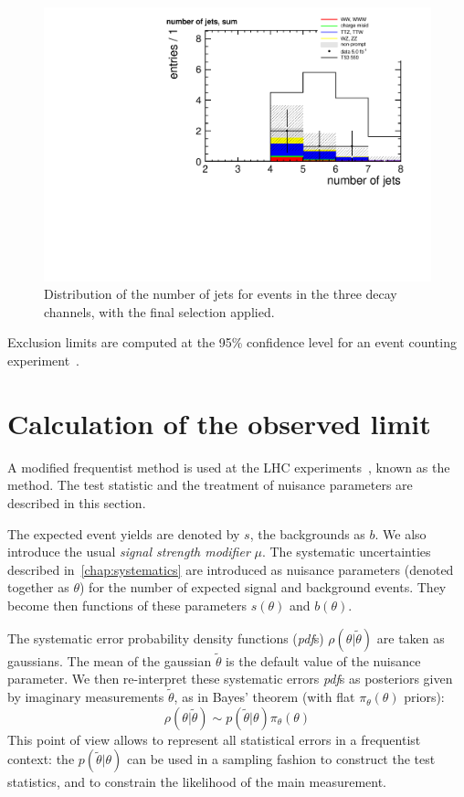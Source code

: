 \begin{figure}[htb]
    \centering
    \includegraphics[width=\textwidth]{images/pdf/4jets_AND_mr200_AND_r02_AND_had_mass350/n_jets_sum_1}
    \caption{Distribution of the number of jets for events in the three decay
        channels, with the final
        selection applied.}
    \label{fig:n_jets_data}
\end{figure}

Exclusion limits are computed at the 95\% confidence level for an event
counting experiment~\cite{2010acat.confE..57M}.

\section{Calculation of the observed limit}
A modified frequentist method is used at the LHC
experiments~\cite{ATLAS:1379837}, known as the \CLs method.
The test statistic and the treatment of nuisance parameters are described in
this section.

The expected \TP event yields are denoted by $s$, the backgrounds as
$b$. We also introduce the usual \emph{signal strength modifier} $\mu$.
The systematic uncertainties described in~\ref{chap:systematics} are
introduced as nuisance parameters (denoted together as $\theta$) for the number of expected signal and
background events. They become then functions of these parameters
$s(\theta)$ and $b(\theta)$.

The systematic error probability density functions (\emph{pdf}s) $\rho(\theta | \tilde\theta)$ are taken as
gaussians. The mean of the gaussian $\tilde \theta$ is the default value of
the nuisance parameter.
We then re-interpret these systematic errors \emph{pdf}s as posteriors given
by imaginary measurements $\tilde \theta$, as in Bayes' theorem (with flat
$\pi_\theta(\theta)$ priors):
\begin{equation*}
    \rho(\theta|\tilde \theta) \sim p(\tilde \theta | \theta)
    \pi_\theta(\theta)
\end{equation*}
This point of view allows to represent all statistical errors in a
frequentist context: the $p(\tilde \theta|\theta)$ can be used in a sampling
fashion to construct the test statistics, and to constrain the likelihood of
the main measurement.

